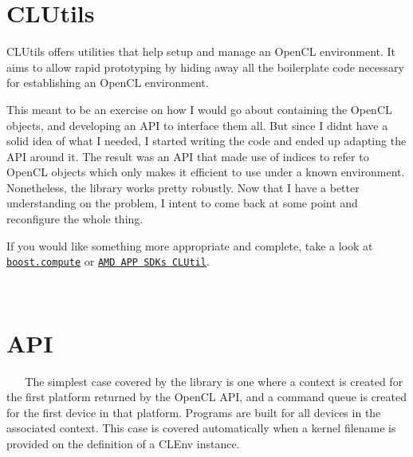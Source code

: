 \section*{C\+L\+Utils }

C\+L\+Utils offers utilities that help setup and manage an Open\+C\+L environment. It aims to allow rapid prototyping by hiding away all the boilerplate code necessary for establishing an Open\+C\+L environment.

This meant to be an exercise on how I would go about containing the Open\+C\+L objects, and developing an A\+P\+I to interface them all. But since I didn\textquotesingle{}t have a solid idea of what I needed, I started writing the code and ended up adapting the A\+P\+I around it. The result was an A\+P\+I that made use of indices to refer to Open\+C\+L objects which only makes it efficient to use under a known environment. Nonetheless, the library works pretty robustly. Now that I have a better understanding on the problem, I intent to come back at some point and reconfigure the whole thing.

If you would like something more appropriate and complete, take a look at \href{https://github.com/kylelutz/compute}{\tt boost.\+compute} or \href{http://developer.amd.com/tools-and-sdks/opencl-zone/amd-accelerated-parallel-processing-app-sdk/}{\tt A\+M\+D A\+P\+P S\+D\+K\textquotesingle{}s C\+L\+Util}.

~\newline
 \section*{A\+P\+I }



~\newline
~\newline
 The simplest case covered by the library is one where a context is created for the first platform returned by the Open\+C\+L A\+P\+I, and a command queue is created for the first device in that platform. Programs are built for all devices in the associated context. This case is covered automatically when a kernel filename is provided on the definition of a {\ttfamily C\+L\+Env} instance.

